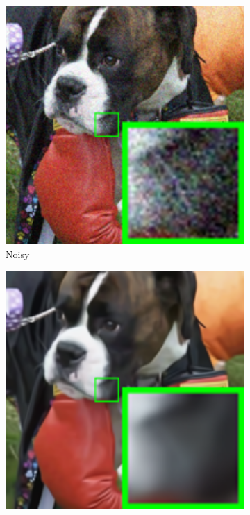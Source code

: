 \begin{figure}
    \centering
    \begin{subfigure}[t]{0.24\textwidth}
        \centering
        \includegraphics[width=1\textwidth]{images/twsc/nc/resize_br_Noisy_dog.png}
		\caption{Noisy}
    \end{subfigure}
    \hfill
    \begin{subfigure}[t]{0.24\textwidth}
        \centering
        \includegraphics[width=1\textwidth]{images/twsc/nc/resize_br_CBM3D_dog.png}

\end{subfigure}
\end{figure}
